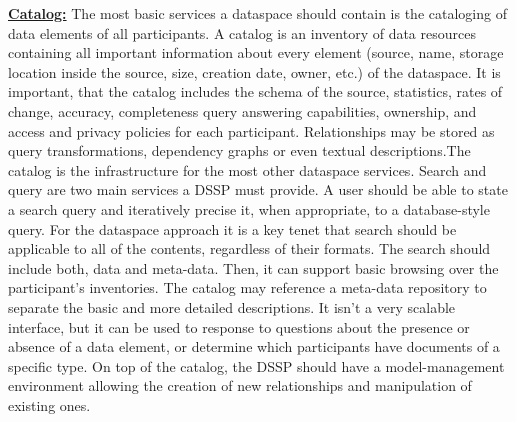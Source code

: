 \uline{\textbf{Catalog:}} 
The most basic services a dataspace should contain is the cataloging of data elements of all participants. A catalog is an inventory of data resources containing all important information about every element (source, name, storage location inside the source, size, creation date, owner, etc.) of the dataspace. It is important, that the catalog includes the schema of the source, statistics, rates of change, accuracy, completeness query answering capabilities, ownership, and access and privacy policies for each participant. Relationships may be stored as query transformations, dependency graphs or even textual descriptions.The catalog is the infrastructure for the most other dataspace services. Search and query are two main services a DSSP must provide. A user should be able to state a search query and iteratively precise it, when appropriate, to a database-style query. For the dataspace approach it is a key tenet that search should be applicable to all of the contents, regardless of their formats.
The search should include both, data and meta-data. Then, it can support basic browsing over the participant's inventories. The catalog may reference a meta-data repository to separate the basic and more detailed descriptions.
It isn't a very scalable interface, but it can be used to response to questions about the presence or absence of a data element, or determine which participants have documents of a specific type. 
On top of the catalog, the DSSP should have a model-management environment allowing the creation of new relationships and manipulation of existing ones.

